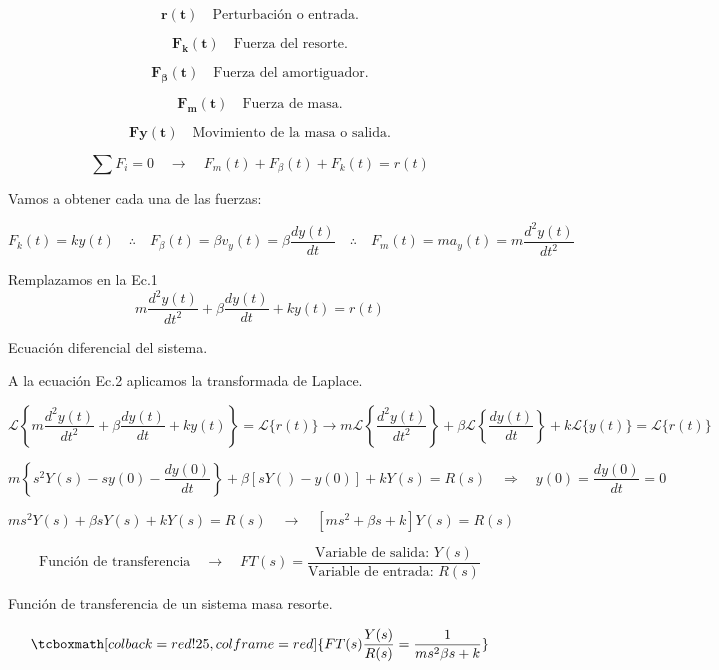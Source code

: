 \documentclass[12pt]{article}
\begin{document}
        $$\mathbf{r(t)} \quad\text{Perturbaci\'on o entrada.}$$

        $$\mathbf{F_{k}(t)}  \quad\text{Fuerza del resorte.}$$

        $$\mathbf{F_{\beta}(t)} \quad\text{Fuerza del amortiguador.}$$

        $$\mathbf{F_{m}(t)} \quad\text{Fuerza de masa.}$$

        $$\mathbf{Fy(t)} \quad\text{Movimiento de la masa o salida.}$$


$$\sum{F_{i}=0} \quad\rightarrow\quad F_{m}(t)+F_{\beta}(t)+F_{k}(t)=r(t)$$

Vamos a obtener cada una de las fuerzas: 

$$F_{k}(t)=ky(t) \quad\therefore\quad F_{\beta}(t)=\beta v_{y}(t)=\beta \frac{dy(t)}{dt} \quad\therefore\quad F_{m}(t)=ma_{y}(t)=m\frac{d^{2}y(t)}{dt^{2}}$$

Remplazamos en la Ec.1
\begin{equation}[Ec.2]
    m\frac{d^{2}y(t)}{dt^{2}} + \beta\frac{dy(t)}{dt} + ky(t) = r(t)
\end{equation}

Ecuación diferencial del sistema.

A la ecuación Ec.2 aplicamos la transformada de Laplace.


$$\mathscr{L} \left\{ m\frac{d^{2}y(t)}{dt^{2}} + \beta\frac{dy(t)}{dt} + ky(t) \right\} = \mathscr{L}\{r(t)\} \rightarrow 
    m \mathscr{L} \left\{ \frac{d^{2}y(t)}{dt^{2}} \right\} + \beta \mathscr{L} \left\{ \frac{dy(t)}{dt} \right\} + k \mathscr{L} \{ y(t) \} = \mathscr{L}\{r(t)\}$$

$$m\left\{ s^{2}Y(s) -sy(0) -\frac{dy(0)}{dt} \right\} + \beta[sY()-y(0)] + kY(s) = R(s)  \quad\Longrightarrow\quad  y(0)=\frac{dy(0)}{dt}=0$$

$$ms^{2}Y(s) + \beta sY(s) + kY(s) = R(s) \quad\rightarrow\quad [m s^{2} + \beta s + k] Y(s) = R(s) $$

$$\text{Funci\'on de transferencia} \quad\rightarrow\quad FT(s)=\frac{\text{Variable de salida: } Y(s)}{\text{Variable de entrada: } R(s)}$$


Funci\'on de transferencia de un sistema masa resorte.


\begin{equation*}
    \tcboxmath[colback=red!25,colframe=red]{ FT(s) \frac{Y(s)}{R(s)} = \frac{1}    {ms^{2} \beta s + k}}
\end{equation*}










 
\end{document}
